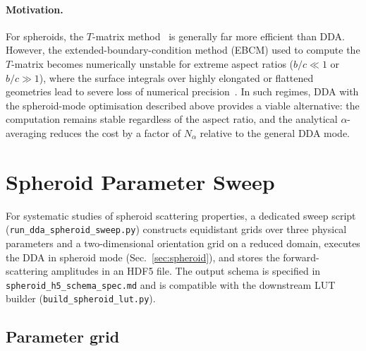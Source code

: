 \documentclass[11pt,a4paper]{article}
\begin{document}
\paragraph{Motivation.}
For spheroids, the $T$-matrix method~\cite{Mishchenko2002} is generally
far more efficient than DDA.  However, the extended-boundary-condition
method (EBCM) used to compute the $T$-matrix becomes numerically
unstable for extreme aspect ratios ($b/c \ll 1$ or $b/c \gg 1$), where
the surface integrals over highly elongated or flattened geometries lead
to severe loss of numerical precision~\cite{Mishchenko2002}.  In such
regimes, DDA with the spheroid-mode optimisation described above provides
a viable alternative: the computation remains stable regardless of the
aspect ratio, and the analytical $\alpha$-averaging reduces the cost by
a factor of $N_\alpha$ relative to the general DDA mode.

\section{Spheroid Parameter Sweep}
\label{sec:spheroid-sweep}

For systematic studies of spheroid scattering properties, a dedicated
sweep script (\texttt{run\_dda\_spheroid\_sweep.py}) constructs equidistant
grids over three physical parameters and a two-dimensional orientation
grid on a reduced domain, executes the DDA in spheroid mode
(Sec.~\ref{sec:spheroid}), and stores the forward-scattering amplitudes
in an HDF5 file.  The output schema is specified in
\texttt{spheroid\_h5\_schema\_spec.md} and is compatible with the
downstream LUT builder (\texttt{build\_spheroid\_lut.py}).

\subsection{Parameter grid}
\label{sec:sweep-grid}
\end{document}
